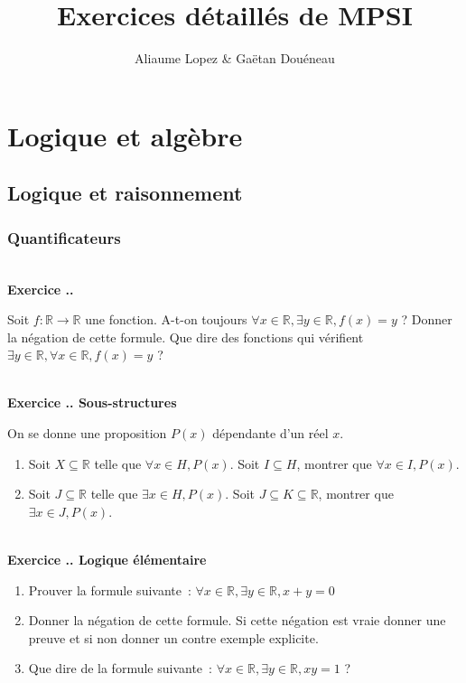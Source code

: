 \documentclass{article}
\newcommand{\mb}[1]{\mathbb{#1}}
\newcounter{exo}
\newcommand{\exercice}[1][\null]{\textbf{\\ Exercice \thesection.\theexo. #1} \addtocounter{exo}{1}}
\begin{document}
\title{Exercices détaillés de MPSI}

\author{Aliaume Lopez \& Gaëtan Douéneau}

\maketitle

\tableofcontents

\pagebreak


\section{Logique et algèbre}

\subsection{Logique et raisonnement}

\subsubsection{Quantificateurs}

\exercice 

Soit $f : \mb{R} \rightarrow \mb{R}$ une fonction. A-t-on toujours $\forall x \in \mb{R}, \exists y \in \mb{R}, f(x) = y$ ? Donner la négation de cette formule. Que dire des fonctions qui vérifient $\exists y \in \mb{R}, \forall x \in \mb{R},  f(x) = y$ ?

\exercice[Sous-structures]

On se donne une proposition $P(x)$ dépendante d'un réel $x$.

\begin{enumerate}

\item Soit $X \subseteq \mb{R}$ telle que $\forall x \in H, P(x)$. Soit $I \subseteq H$, montrer que $\forall x \in I, P(x)$.

\item Soit $J \subseteq \mb{R}$ telle que $\exists x \in H, P(x)$. Soit $J \subseteq K \subseteq \mb{R}$, montrer que $\exists x \in J, P(x)$.
\end{enumerate}

\exercice[Logique élémentaire]

\begin{enumerate}
    \item Prouver la formule suivante~: $\forall x \in \mathbb{R}, \exists y \in
        \mathbb{R}, x + y = 0$

    \item Donner la négation de cette formule. Si cette négation est vraie
        donner une preuve et si non donner un contre exemple explicite.

    \item Que dire de la formule suivante~: $\forall x \in \mathbb{R}, \exists y \in
        \mathbb{R}, xy = 1$ ?
\end{enumerate}
\end{document}
